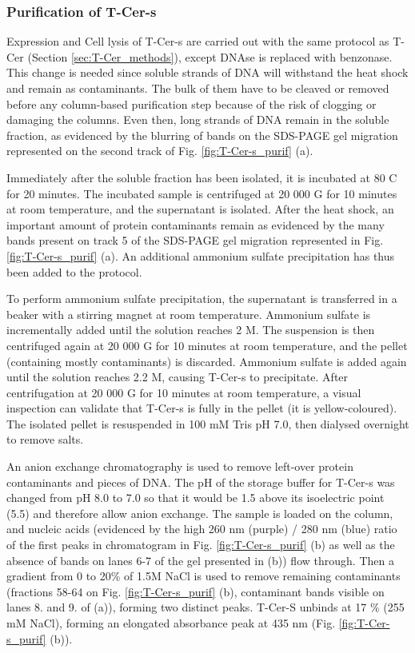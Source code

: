 \subsubsection{Purification of T-Cer-s}

Expression and Cell lysis of T-Cer-s are carried out with the same protocol as T-Cer (Section \ref{sec:T-Cer_methods}), except DNAse is replaced with benzonase. This change is needed since soluble strands of DNA will withstand the heat shock and remain as contaminants. The bulk of them have to be cleaved or removed before any column-based purification step because of the risk of clogging or damaging the columns. Even then, long strands of DNA remain in the soluble fraction, as evidenced by the blurring of bands on the SDS-PAGE gel migration represented on the second track of Fig. \ref{fig:T-Cer-s_purif} (a). 

Immediately after the soluble fraction has been isolated, it is incubated at 80 \degree C for 20 minutes. The incubated sample is centrifuged at 20 000 G for 10 minutes at room temperature, and the supernatant is isolated. After the heat shock, an important amount of  protein contaminants remain as evidenced by the many bands present on track 5 of the SDS-PAGE gel migration represented in Fig. \ref{fig:T-Cer-s_purif} (a). An additional ammonium sulfate precipitation has thus been added to the protocol. 

To perform ammonium sulfate precipitation, the supernatant is transferred in a beaker with a stirring magnet at room temperature. Ammonium sulfate is incrementally added until the solution reaches 2 M. The suspension is then centrifuged again at 20 000 G for 10 minutes at room temperature, and the pellet (containing mostly contaminants) is discarded. Ammonium sulfate is added again until the solution reaches 2.2 M, causing T-Cer-s to precipitate. After centrifugation at 20 000 G for 10 minutes at room temperature, a visual inspection can validate that T-Cer-s is fully in the pellet (it is yellow-coloured). The isolated pellet is resuspended in 100 mM Tris pH 7.0, then dialysed overnight to remove salts. 

An anion exchange chromatography is used to remove left-over protein contaminants and pieces of DNA. The pH of the storage buffer for T-Cer-s was changed from pH 8.0 to 7.0 so that it would be 1.5 above its isoelectric point (5.5) and therefore allow anion exchange. The sample is loaded on the column, and nucleic acids (evidenced by the high 260 nm (purple) / 280 nm (blue) ratio of the first peaks in chromatogram in Fig. \ref{fig:T-Cer-s_purif} (b) as well as the absence of bands on lanes 6-7 of the gel presented in (b))  flow through. Then a gradient from 0 to 20\% of 1.5M NaCl is used to remove remaining contaminants (fractions 58-64 on Fig. \ref{fig:T-Cer-s_purif} (b), contaminant bands visible on lanes 8. and 9. of (a)), forming two distinct peaks. T-Cer-S unbinds at 17 \% (255 mM NaCl), forming an elongated absorbance peak at 435 nm (Fig. \ref{fig:T-Cer-s_purif} (b)). 


